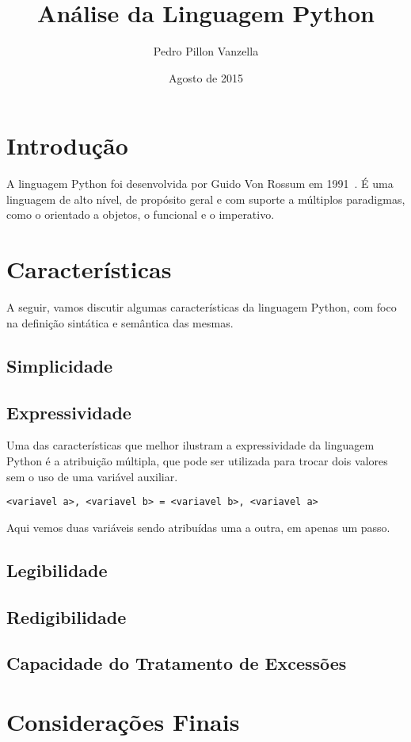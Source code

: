 \documentclass[12pt]{article}
\title{Análise da Linguagem Python}
\author{Pedro Pillon Vanzella}
\date{Agosto de 2015}
\begin{document}
 

\maketitle
     
\section{Introdução}\label{sec:introducao}

A linguagem Python foi desenvolvida por Guido Von Rossum em 1991~\cite{venners:2003}. É uma
linguagem de alto nível, de propósito geral e com suporte a múltiplos
paradigmas, como o orientado a objetos, o funcional e o imperativo.

\section{Características}\label{sec:caracteristicas}

A seguir, vamos discutir algumas características da linguagem Python, com foco
na definição sintática e semântica das mesmas.

\subsection{Simplicidade}\label{sec:simplicidade}

\subsection{Expressividade}\label{sec:expressividade}

Uma das características que melhor ilustram a expressividade da linguagem Python
é a atribuição múltipla, que pode ser utilizada para trocar dois valores sem o
uso de uma variável auxiliar.

\begin{lstlisting}
<variavel a>, <variavel b> = <variavel b>, <variavel a>
\end{lstlisting}

Aqui vemos duas variáveis sendo atribuídas uma a outra, em apenas um passo.

\subsection{Legibilidade}\label{sec:legibilidade}

\subsection{Redigibilidade}\label{sec:redigibilidade}

\subsection{Capacidade do Tratamento de Excessões}\label{sec:excessoes}


\section{Considerações Finais}


\printbibliography
\end{document}
